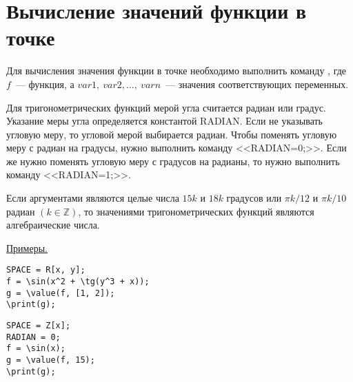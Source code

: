 \section{Вычисление значений функции в точке}

Для вычисления значения функции в точке необходимо выполнить команду 
, 
где $f$~--- функция,  а $var1,\  var2,\ldots,\ varn$~--- значения соответствующих переменных. 

Для тригонометрических функций мерой угла считается радиан или градус.  Указание меры угла определяется константой RADIAN.  
Если не указывать угловую меру,  то угловой мерой выбирается радиан.  Чтобы поменять угловую меру с радиан на градусы, 
нужно выполнить команду <<RADIAN=0;>>.  Если же нужно поменять угловую меру с градусов на радианы,  то
нужно выполнить команду <<RADIAN=1;>>. 

Если аргументами являются целые числа $15k$ и $18k$  градусов или
  $\pi k/12$ и $\pi k/10$ радиан $(k\in \mathbb Z)$,  то
значениями тригонометрических функций являются алгебраические числа.  
\smallskip

\underline{Примеры. }

\vspace*{-2mm}%
\begin{verbatim}
SPACE = R[x, y];
f = \sin(x^2 + \tg(y^3 + x));
g = \value(f, [1, 2]);
\print(g);
\end{verbatim}
\vspace*{-2mm}


\begin{verbatim}
SPACE = Z[x];
RADIAN = 0;
f = \sin(x); 
g = \value(f, 15); 
\print(g);
\end{verbatim}
\vspace*{-2mm}


